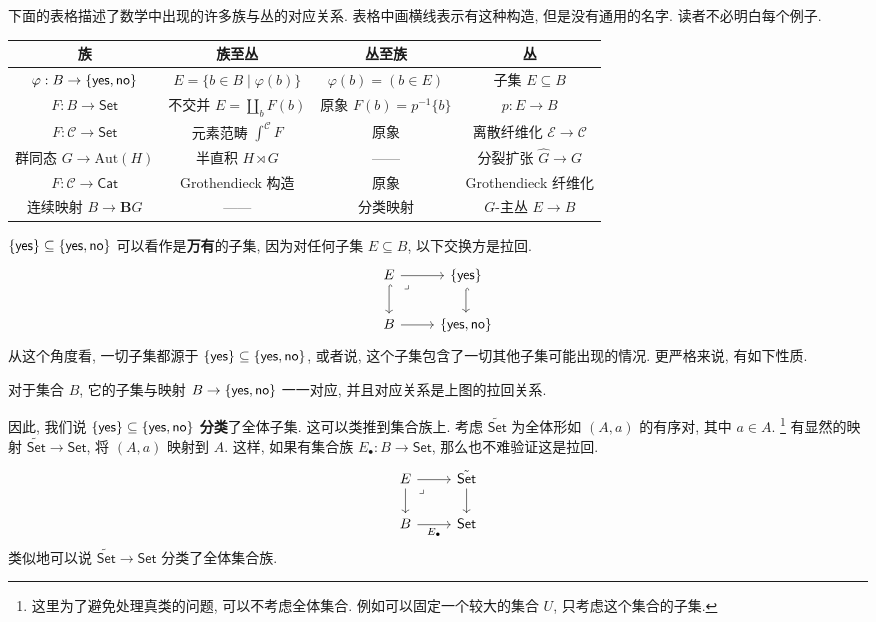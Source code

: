 下面的表格描述了数学中出现的许多族与丛的对应关系.
表格中画横线表示有这种构造, 但是没有通用的名字.
读者不必明白每个例子.

\begin{center}
\begin{tabular}{c c c c}\hline
族 & 族至丛 & 丛至族 & 丛\\\hline
\(\varphi : B \to \{\textnormal{\textsf{yes}}, \textnormal{\textsf{no}}\}\) &
\(E = \{b \in B \mid \varphi(b)\}\) &
\(\varphi(b) = (b \in E)\)&
子集 \(E \subseteq B\) \\
\(F : B \to \mathsf{Set}\) &
\!\!不交并 \(E = \coprod_{b} F(b)\)\!\! &
原象 \(F(b) = p^{-1}\{b\}\) &
\(p : E \to B\)\\
\(F : \mathcal C \to \mathsf{Set}\) &
元素范畴 \(\int^{\mathcal C}F\) &
原象 &
离散纤维化 \(\mathcal E \to \mathcal C\)\\
\!群同态 \(G \to \mathrm{Aut}(H)\)\!&
半直积 \(H \rtimes G\) &
------ &
分裂扩张 \(\hat G \to G\)\\
\(F : \mathcal C \to \mathsf{Cat}\) &
\!Grothendieck 构造\! &
原象 &
\!Grothendieck 纤维化\! \\
连续映射 \(B \to \mathbf{B}G\) &
------ &
分类映射 &
\(G\)-主丛 \(E \to B\)
\\\hline
\end{tabular}
\end{center}

\(\{\textnormal{\textsf{yes}}\} \subseteq \{\textnormal{\textsf{yes}}, \textnormal{\textsf{no}}\}\)
可以看作是\textbf{万有}的子集, 因为对任何子集 \(E \subseteq B\),
以下交换方是拉回.
\[\begin{tikzcd}
  E & {\{\cons{yes}\}} \\
  B & {\{\cons{yes}, \cons{no}\}}
  \arrow[hook, from=1-1, to=2-1]
  \arrow[hook, from=1-2, to=2-2]
  \arrow[from=1-1, to=1-2]
  \arrow[from=2-1, to=2-2]
  \arrow["\lrcorner"{anchor=center, pos=0.125}, draw=none, from=1-1, to=2-2]
\end{tikzcd}\]
从这个角度看, 一切子集都源于
\(\{\textnormal{\textsf{yes}}\} \subseteq \{\textnormal{\textsf{yes}}, \textnormal{\textsf{no}}\}\),
或者说, 这个子集包含了一切其他子集可能出现的情况.
更严格来说, 有如下性质.
\begin{theorem}
对于集合 \(B\), 它的子集与映射 \(B \to \{\textnormal{\textsf{yes}}, \textnormal{\textsf{no}}\}\)
一一对应, 并且对应关系是上图的拉回关系.
\end{theorem}
因此, 我们说 \(\{\textnormal{\textsf{yes}}\} \subseteq \{\textnormal{\textsf{yes}}, \textnormal{\textsf{no}}\}\)
\textbf{分类}了全体子集.
这可以类推到集合族上.
考虑 \(\tilde{\mathsf{Set}}\) 为全体形如
\((A, a)\) 的有序对, 其中 \(a \in A\).%
\footnote{这里为了避免处理真类的问题, 可以不考虑全体集合.
例如可以固定一个较大的集合 \(U\), 只考虑这个集合的子集.}
有显然的映射 \(\tilde{\mathsf{Set}} \to \mathsf{Set}\),
将 \((A, a)\) 映射到 \(A\).
这样, 如果有集合族 \(E_\bullet : B \to \mathsf{Set}\),
那么也不难验证这是拉回.
\[\begin{tikzcd}
  E & {\tilde{\mathsf{Set}}} \\
  B & {\mathsf{Set}}
  \arrow[from=1-1, to=2-1]
  \arrow[from=1-2, to=2-2]
  \arrow[from=1-1, to=1-2]
  \arrow["{E_\bullet}"', from=2-1, to=2-2]
  \arrow["\lrcorner"{anchor=center, pos=0.125}, draw=none, from=1-1, to=2-2]
\end{tikzcd}\]
类似地可以说 \(\tilde{\mathsf{Set}} \to \mathsf{Set}\) 分类了全体集合族.

